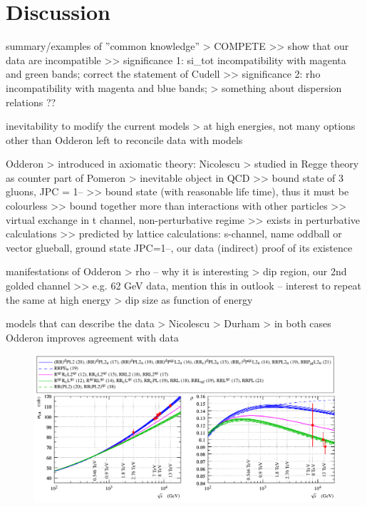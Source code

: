 \section{Discussion}
\label{sec:discussion}

\bgroup
\parskip=0pt

\> summary/examples of ''common knowledge''
\>> COMPETE
\>>> show that our data are incompatible
\>>> significance 1: si\_tot incompatibility with magenta and green bands; correct the statement of Cudell
\>>> significance 2: rho incompatibility with magenta and blue bands;
\>> something about dispersion relations ??

\> inevitability to modify the current models
\>> at high energies, not many options other than Odderon left to reconcile data with models

\> Odderon
\>> introduced in axiomatic theory: Nicolescu
\>> studied in Regge theory as counter part of Pomeron
\>> inevitable object in QCD 
\>>> bound state of 3 gluons, JPC = 1--
\>>> bound state (with reasonable life time), thus it must be colourless
\>>> bound together more than interactions with other particles
\>>> virtual exchange in t channel, non-perturbative regime
\>>> exists in perturbative calculations
\>>> predicted by lattice calculations: s-channel, name oddball or vector glueball, ground state JPC=1--, our data (indirect) proof of its existence

\> manifestations of Odderon
\>> rho -- why it is interesting
\>> dip region, our 2nd golded channel
\>>> e.g. 62 GeV data, mention this in outlook -- interest to repeat the same at high energy
\>> dip size as function of energy

\> models that can describe the data
\>> Nicolescu
\>> Durham
\>> in both cases Odderon improves agreement with data


\egroup


\begin{figure}
\vskip-5mm
\begin{center}
\includegraphics{fig/compete_bands_si_tot_rho.pdf}
\caption{%
}
\label{fig:comp bands}
\end{center}
\end{figure}




